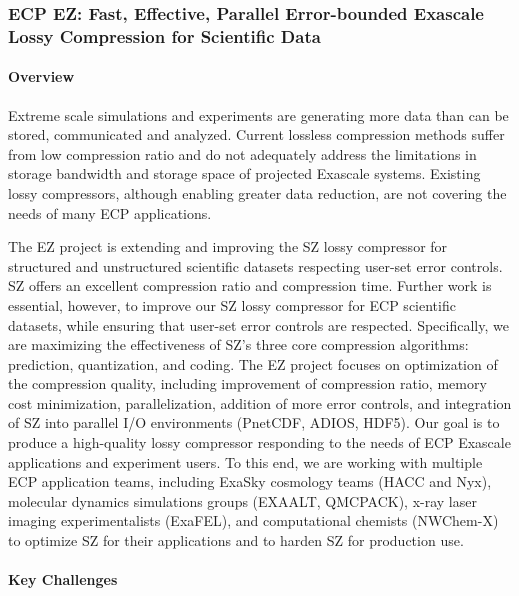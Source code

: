 \subsubsection{ ECP EZ: Fast, Effective, Parallel Error-bounded Exascale Lossy Compression for Scientific Data}

\paragraph{Overview}

Extreme scale simulations and experiments are generating more data than can be stored, communicated and analyzed. Current lossless compression methods suffer from low compression ratio and do not adequately address the limitations in storage bandwidth and storage space of projected Exascale systems. Existing lossy compressors, although enabling greater data reduction, are not covering the needs of many ECP applications.

The EZ project is extending and improving the SZ lossy compressor for structured and unstructured scientific datasets respecting user-set error controls. SZ offers an excellent compression ratio and compression time. Further work is essential, however, to improve our SZ lossy compressor for ECP scientific datasets, while ensuring that user-set error controls are respected. Specifically, we are maximizing the effectiveness of SZ's three core compression algorithms: prediction, quantization, and coding. The EZ project focuses on optimization of the compression quality, including improvement of compression ratio, memory cost minimization, parallelization, addition of more error controls, and integration of SZ into parallel I/O environments (PnetCDF, ADIOS, HDF5). Our goal is to produce a high-quality lossy compressor responding to the needs of ECP Exascale applications and experiment users. To this end, we are working with multiple ECP application teams, including ExaSky cosmology teams (HACC and Nyx), molecular dynamics simulations groups (EXAALT, QMCPACK), x-ray laser imaging experimentalists (ExaFEL), and computational chemists (NWChem-X) to optimize SZ for their applications and to harden SZ for production use.

\paragraph{Key Challenges}


